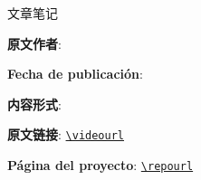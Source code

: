 
\begin{titlepage}
\centering
{\Large 文章笔记\par}
\vspace{1.2cm}
{\huge\bfseries \notetitle\par}
\vspace{0.8cm}
{\large \noteauthors\par}
\vspace{0.3cm}
{\large \notedate\par}
\vspace{1.2cm}

\vfill
\begin{tcolorbox}[width=0.9\textwidth, colback=black!2!white, colframe=black!60, sharp corners]
\textbf{原文作者}: \videochannel\par
\textbf{Fecha de publicación}: \videopublishdate\par
\textbf{内容形式}: \videoduration\par
\textbf{原文链接}: \href{\videourl}{\nolinkurl{\videourl}}\par
\textbf{Página del proyecto}: \href{\repourl}{\nolinkurl{\repourl}}\par
\end{tcolorbox}
\end{titlepage}

\tableofcontents
\newpage


